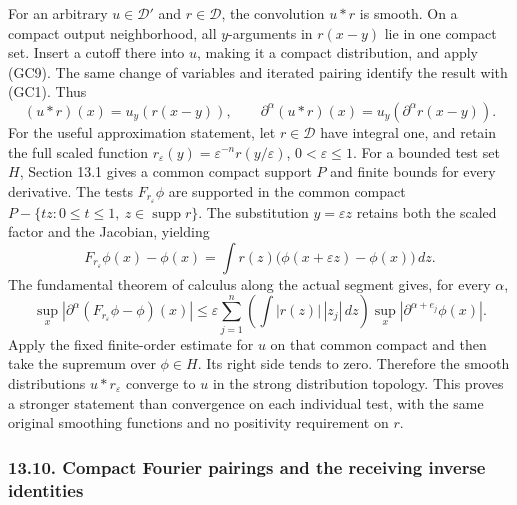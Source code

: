 \documentclass[
  11pt,
]{article}
\begin{document}
For an arbitrary \(u\in\mathcal D'\) and \(r\in\mathcal D\), the
convolution \(u*r\) is smooth. On a compact output neighborhood, all
\(y\)-arguments in \(r(x-y)\) lie in one compact set. Insert a cutoff
there into \(u\), making it a compact distribution, and apply (GC9). The
same change of variables and iterated pairing identify the result with
(GC1). Thus \[
 (u*r)(x)=u_y(r(x-y)),\qquad
 \partial^\alpha(u*r)(x)=u_y(\partial^\alpha r(x-y)).
 \tag{GC11}
\] For the useful approximation statement, let \(r\in\mathcal D\) have
integral one, and retain the full scaled function
\(r_\varepsilon(y)=\varepsilon^{-n}r(y/\varepsilon)\),
\(0<\varepsilon\leq1\). For a bounded test set \(H\), Section 13.1 gives
a common compact support \(P\) and finite bounds for every derivative.
The tests \(F_{r_\varepsilon}\phi\) are supported in the common compact
\(P-\{tz:0\leq t\leq1,\ z\in\operatorname{supp}r\}\). The substitution
\(y=\varepsilon z\) retains both the scaled factor and the Jacobian,
yielding \[
 F_{r_\varepsilon}\phi(x)-\phi(x)
       =\int r(z)\bigl(\phi(x+\varepsilon z)-\phi(x)\bigr)\,dz.
 \tag{GC12}
\] The fundamental theorem of calculus along the actual segment gives,
for every \(\alpha\), \[
 \sup_x|\partial^\alpha(F_{r_\varepsilon}\phi-\phi)(x)|
 \leq\varepsilon\sum_{j=1}^n
       \left(\int|r(z)|\,|z_j|\,dz\right)
       \sup_x|\partial^{\alpha+e_j}\phi(x)|.
 \tag{GC13}
\] Apply the fixed finite-order estimate for \(u\) on that common
compact and then take the supremum over \(\phi\in H\). Its right side
tends to zero. Therefore the smooth distributions \(u*r_\varepsilon\)
converge to \(u\) in the strong distribution topology. This proves a
stronger statement than convergence on each individual test, with the
same original smoothing functions and no positivity requirement on
\(r\).

\subsubsection{13.10. Compact Fourier pairings and the receiving inverse
identities}\label{compact-fourier-pairings-and-the-receiving-inverse-identities}
\end{document}
